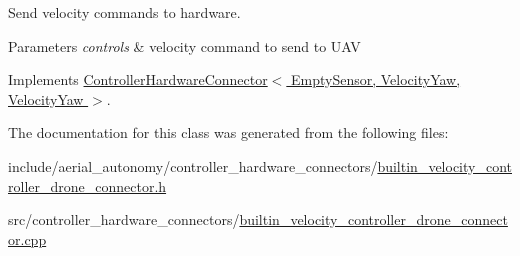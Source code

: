 Send velocity commands to hardware. 


\begin{DoxyParams}{Parameters}
{\em controls} & velocity command to send to U\-A\-V \\
\hline
\end{DoxyParams}


Implements \hyperlink{classControllerHardwareConnector_a5fc86156d5c747aba36497732962d6d0}{Controller\-Hardware\-Connector$<$ Empty\-Sensor, Velocity\-Yaw, Velocity\-Yaw $>$}.



The documentation for this class was generated from the following files\-:\begin{DoxyCompactItemize}
\item 
include/aerial\-\_\-autonomy/controller\-\_\-hardware\-\_\-connectors/\hyperlink{builtin__velocity__controller__drone__connector_8h}{builtin\-\_\-velocity\-\_\-controller\-\_\-drone\-\_\-connector.\-h}\item 
src/controller\-\_\-hardware\-\_\-connectors/\hyperlink{builtin__velocity__controller__drone__connector_8cpp}{builtin\-\_\-velocity\-\_\-controller\-\_\-drone\-\_\-connector.\-cpp}\end{DoxyCompactItemize}
